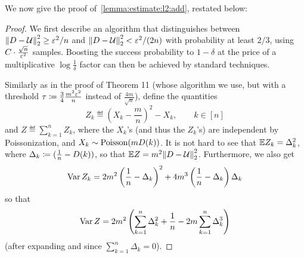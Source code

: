 We now give the proof of~\cref{lemma:estimate:l2:add}, restated below:
\lemmaestimateltwoadd*
\begin{proof}
We first describe an algorithm that distinguishes between ${\lVert D-\mathcal{U}{\rVert}}_2^2 \geq \varepsilon^2/{n}$ and ${\lVert D-\mathcal{U}{\rVert}}_2^2 < \varepsilon^2/(2n)$ with probability at least $2/3$, using $C\cdot\frac{\sqrt{n}}{\varepsilon^2}$ samples. Boosting the success probability to $1-\delta$ at the price of a multiplicative $\log\frac{1}{\delta}$ factor can then be achieved by standard techniques.

Similarly as in the proof of Theorem 11 (whose algorithm we use, but with a threshold $\tau\coloneqq \frac{3}{4}\frac{m^2\varepsilon^2}{n}$ instead of $\frac{4m}{\sqrt{n}}$), define the quantities
\[
Z_k \eqdef \left(X_k-\frac{m}{n}\right)^2 - X_k,\qquad k\in[n]
\]
and $Z\eqdef\sum_{k=1}^n Z_k$, where the $X_k$'s (and thus the $Z_k$'s) are independent by Poissonization, and $X_k\sim\operatorname{Poisson}\!\left( m D(k) \right) $. It is not hard to see that $\mathbb{E} Z_k = \Delta_k^2$, where $\Delta_k\coloneqq (\frac{1}{n}-D(k))$, so that $\mathbb{E} Z = m^2{\lVert D-\mathcal{U}{\rVert}}_2^2$. Furthermore, we also get
\[
  \operatorname{Var} Z_k = 2m^2\left(\frac{1}{n}-\Delta_k\right)^2 + 4m^3\left(\frac{1}{n}-\Delta_k\right)\Delta_k
\]
so that
\begin{equation}\label{eq:estimate:l2:add:variance}
  \operatorname{Var} Z = 2m^2\left( \sum_{k=1}^n \Delta_k^2 + \frac{1}{n} -2 m\sum_{k=1}^n \Delta_k^3\right)
\end{equation}
(after expanding and since $\sum_{k=1}^n \Delta_k = 0$).


\end{proof}
